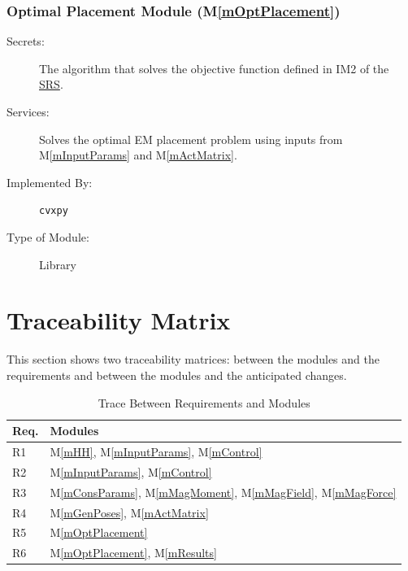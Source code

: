 \documentclass[12pt, titlepage]{article}
\newcommand{\mref}[1]{M\ref{#1}}
\begin{document}
\subsubsection{Optimal Placement Module (\mref{mOptPlacement})}
\begin{description}
  \item[Secrets:]The algorithm that solves the objective function defined in IM2 of the \href{https://github.com/husseinsd1/optimal-em-arrangement/blob/main/docs/SRS/SRS.pdf}{SRS}.
  \item[Services:]Solves the optimal EM placement problem using inputs from \mref{mInputParams} and \mref{mActMatrix}.
  \item[Implemented By:] \texttt{cvxpy}
  \item[Type of Module:] Library
\end{description}

\section{Traceability Matrix} \label{SecTM}

This section shows two traceability matrices: between the modules and the
requirements and between the modules and the anticipated changes.

\begin{table}[H]
\centering
\begin{tabular}{p{} p{}}
\toprule
\textbf{Req.} & \textbf{Modules}\\
\midrule
R1 & \mref{mHH}, \mref{mInputParams}, \mref{mControl}\\
R2 & \mref{mInputParams}, \mref{mControl}\\
R3 & \mref{mConsParams}, \mref{mMagMoment}, \mref{mMagField}, \mref{mMagForce}\\
R4 & \mref{mGenPoses}, \mref{mActMatrix}\\
R5 & \mref{mOptPlacement}\\
R6 & \mref{mOptPlacement}, \mref{mResults}\\
\bottomrule
\end{tabular}
\caption{Trace Between Requirements and Modules}
\label{TblRT}
\end{table}
\end{document}
